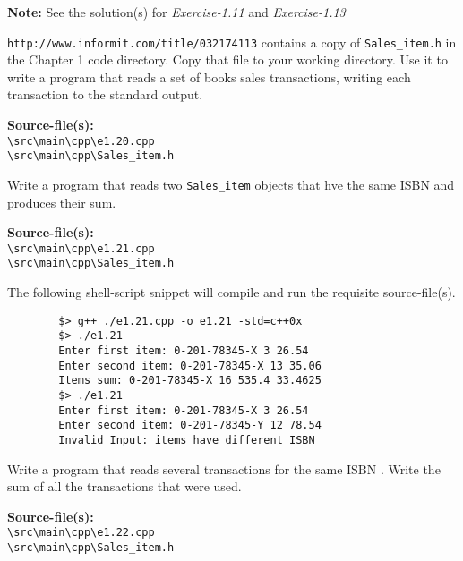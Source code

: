 \documentclass[12pt, a4paper]{article}
\begin{document}
    \noindent\textbf{Note:} See the solution(s) for \textit{Exercise-1.11} and \textit{Exercise-1.13}

    \bigskip
    \begin{tcolorbox}[title={Exercise: 1.20}]
        \texttt{http://www.informit.com/title/032174113} contains a copy of \texttt{Sales\_item.h} in the Chapter 1 code directory.
        Copy that file to your working directory.
        Use it to write a program that reads a set of books sales transactions, writing each transaction to the standard output.
    \end{tcolorbox}
    \noindent\textbf{Source-file(s):}
    \\ \texttt{\textbackslash src\textbackslash main\textbackslash cpp\textbackslash e1.20.cpp}
    \\ \texttt{\textbackslash src\textbackslash main\textbackslash cpp\textbackslash Sales\_item.h}

    \bigskip
    \begin{tcolorbox}[title={Exercise: 1.21}]
        Write a program that reads two \texttt{Sales\_item} objects that hve the same ISBN and produces their sum.
    \end{tcolorbox}
    \noindent\textbf{Source-file(s):}
    \\ \texttt{\textbackslash src\textbackslash main\textbackslash cpp\textbackslash e1.21.cpp}
    \\ \texttt{\textbackslash src\textbackslash main\textbackslash cpp\textbackslash Sales\_item.h}

    \noindent The following shell-script snippet will compile and run the requisite source-file(s).
    \begin{verbatim}
        $> g++ ./e1.21.cpp -o e1.21 -std=c++0x
        $> ./e1.21
        Enter first item: 0-201-78345-X 3 26.54
        Enter second item: 0-201-78345-X 13 35.06
        Items sum: 0-201-78345-X 16 535.4 33.4625
        $> ./e1.21
        Enter first item: 0-201-78345-X 3 26.54
        Enter second item: 0-201-78345-Y 12 78.54
        Invalid Input: items have different ISBN
    \end{verbatim}

    \bigskip
    \begin{tcolorbox}[title={Exercise: 1.22}]
        Write a program that reads several transactions for the same ISBN .
        Write the sum of all the transactions that were used.
    \end{tcolorbox}
    \noindent\textbf{Source-file(s):}
    \\ \texttt{\textbackslash src\textbackslash main\textbackslash cpp\textbackslash e1.22.cpp}
    \\ \texttt{\textbackslash src\textbackslash main\textbackslash cpp\textbackslash Sales\_item.h}
\end{document}

